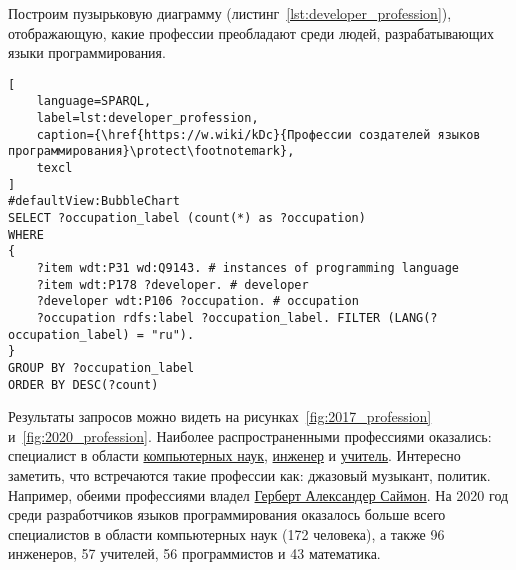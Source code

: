 \begin{marginfigure}[-302pt]
{
\setlength{\fboxsep}{0pt}
\setlength{\fboxrule}{1pt}
}
  \caption{Профессии людей, которые разрабатывают языки программирования (2017).}
  \label{fig:2017_profession}
\end{marginfigure}
\begin{marginfigure}[-52pt]
{
\setlength{\fboxsep}{0pt}
\setlength{\fboxrule}{1pt}
}
  \caption{Профессии людей, которые разрабатывают языки программирования (2020).}
  \label{fig:2020_profession}
\end{marginfigure}
Построим пузырьковую диаграмму (листинг~\ref{lst:developer_profession}), отображающую, какие профессии преобладают среди людей, разрабатывающих языки программирования.
\begin{lstlisting}[
	language=SPARQL,
	label=lst:developer_profession,
	caption={\href{https://w.wiki/kDc}{Профессии создателей языков программирования}\protect\footnotemark},
	texcl
]
#defaultView:BubbleChart
SELECT ?occupation_label (count(*) as ?occupation)
WHERE
{
    ?item wdt:P31 wd:Q9143. # instances of programming language 
    ?item wdt:P178 ?developer. # developer
    ?developer wdt:P106 ?occupation. # occupation
    ?occupation rdfs:label ?occupation_label. FILTER (LANG(?occupation_label) = "ru"). 
}
GROUP BY ?occupation_label 
ORDER BY DESC(?count)
\end{lstlisting}


Результаты запросов можно видеть на рисунках~\ref{fig:2017_profession} и~\ref{fig:2020_profession}.
Наиболее распространенными профессиями оказались: специалист в области \href{https://www.wikidata.org/wiki/Q21198}{компьютерных наук}, \href{https://www.wikidata.org/wiki/Q81096}{инженер} и \href{https://www.wikidata.org/wiki/Q37226}{учитель}. Интересно заметить, что встречаются такие профессии как: джазовый музыкант, политик. Например, обеими профессиями владел \href{https://www.wikidata.org/wiki/Q181529}{Герберт Александер Саймон}. На 2020 год среди разработчиков языков программирования оказалось больше всего специалистов в области компьютерных наук (172 человека), а также 96 инженеров, 57 учителей, 56 программистов и 43 математика.


